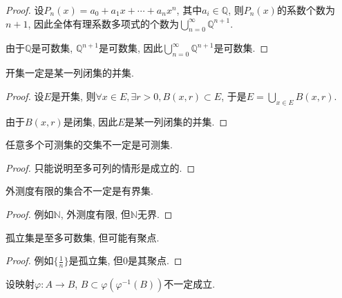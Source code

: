 \documentclass[theorem=false,mathfont=none,openany,sub3section]{easybook}
\begin{document}
\begin{proof}
  设$P_n(x)=a_0+a_1x+\cdots+a_nx^n$, 其中$a_i\in \mathbb{Q}$, 则$P_n(x)$的系数个数为$n+1$, 因此全体有理系数多项式的个数为$\bigcup_{n=0}^{\infty}\mathbb{Q}^{n+1}$.\par
  由于$\mathbb{Q}$是可数集, $\mathbb{Q}^{n+1}$是可数集, 因此$\bigcup_{n=0}^{\infty}\mathbb{Q}^{n+1}$是可数集.\par
\end{proof}

\begin{example}
  开集一定是某一列闭集的并集.
\end{example}

\begin{proof}
  设$E$是开集, 则$\forall x\in E, \exists r>0, B(x,r)\subset E$, 于是$E=\bigcup_{x\in E}B(x,r)$.\par
  由于$B(x,r)$是闭集, 因此$E$是某一列闭集的并集.\par
\end{proof}

\begin{example}
  任意多个可测集的交集不一定是可测集.
\end{example}

\begin{proof}
  只能说明至多可列的情形是成立的.\par
\end{proof}

\begin{example}
  外测度有限的集合不一定是有界集.\par
\end{example}

\begin{proof}
  例如$\mathbb{N}$, 外测度有限, 但$\mathbb{N}$无界.\par
\end{proof}

\begin{example}
  孤立集是至多可数集, 但可能有聚点.\par
\end{example}

\begin{proof}
  例如$\{\frac{1}{n}\}$是孤立集, 但$0$是其聚点.\par
\end{proof}

\begin{example}
  设映射$\varphi : A \to B$, $B \subset \varphi(\varphi^{-1}(B))$不一定成立.
\end{example}
\end{document}
